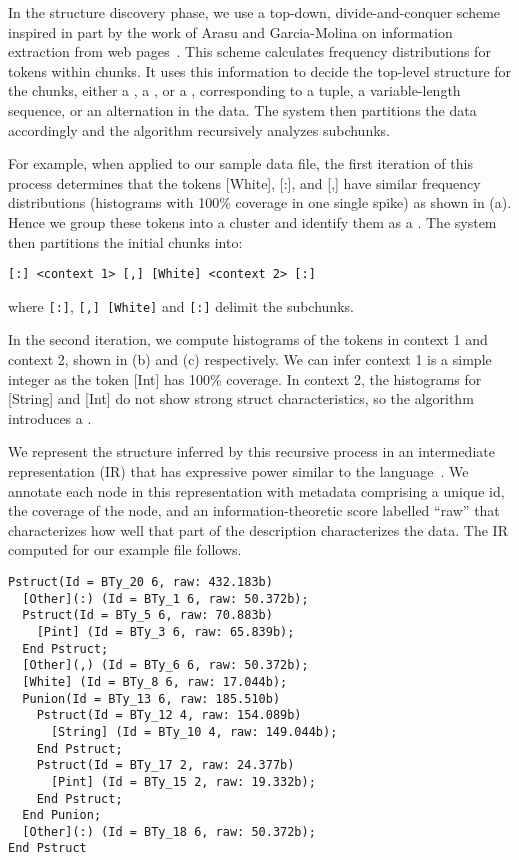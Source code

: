 \documentclass[preprint]{sig-alternate-sigmod08}
\begin{document}
In the structure discovery phase, we use a top-down, divide-and-conquer
scheme inspired in part by the work of Arasu and Garcia-Molina on
information extraction from web pages~\cite{arasu+:sigmod03}. 
This scheme calculates frequency distributions for tokens within
chunks.  It uses this information to
decide the top-level structure for the chunks, either a 
, a , or a , corresponding to a
tuple, a variable-length sequence, or an alternation in the data.
The system then partitions the data accordingly
and the algorithm recursively analyzes subchunks. 

For example, when applied to our sample data file, the first iteration of this
process determines that the tokens
[White], [:], and [,] have similar frequency distributions
(histograms with 100\% coverage in one single spike) as shown in (a).
Hence we group these tokens
into a cluster and identify them as a . 
The system then partitions the initial chunks into:

{\small
\begin{verbatim}
[:] <context 1> [,] [White] <context 2> [:]
\end{verbatim}
}
\noindent where \verb#[:]#, \verb#[,] [White]# and \verb#[:]# delimit
the subchunks.

In the second iteration, we compute histograms of the tokens in context 1 and
context 2, shown in (b) and (c) 
respectively. We can infer context 1 is a simple integer
as the token [Int] has 100\% coverage. In context 2,
the histograms for [String] and [Int] do not
show strong struct characteristics, so the algorithm introduces
a .  

We represent the structure inferred by this recursive process
in an intermediate representation (IR) that has 
expressive power similar to the \pads{} language~\cite{fisher+:popl06}.  
We annotate each node in this representation with metadata
comprising a unique id, the coverage of the node,
and an information-theoretic score labelled ``raw'' that characterizes
how well that part of the description characterizes the data.  
The IR computed for our example file follows.

{\small
\begin{verbatim}
Pstruct(Id = BTy_20 6, raw: 432.183b)
  [Other](:) (Id = BTy_1 6, raw: 50.372b);
  Pstruct(Id = BTy_5 6, raw: 70.883b)
    [Pint] (Id = BTy_3 6, raw: 65.839b);
  End Pstruct;
  [Other](,) (Id = BTy_6 6, raw: 50.372b);
  [White] (Id = BTy_8 6, raw: 17.044b);
  Punion(Id = BTy_13 6, raw: 185.510b)
    Pstruct(Id = BTy_12 4, raw: 154.089b)
      [String] (Id = BTy_10 4, raw: 149.044b);
    End Pstruct;
    Pstruct(Id = BTy_17 2, raw: 24.377b)
      [Pint] (Id = BTy_15 2, raw: 19.332b);
    End Pstruct;
  End Punion;
  [Other](:) (Id = BTy_18 6, raw: 50.372b);
End Pstruct
\end{verbatim}
}
\end{document}

